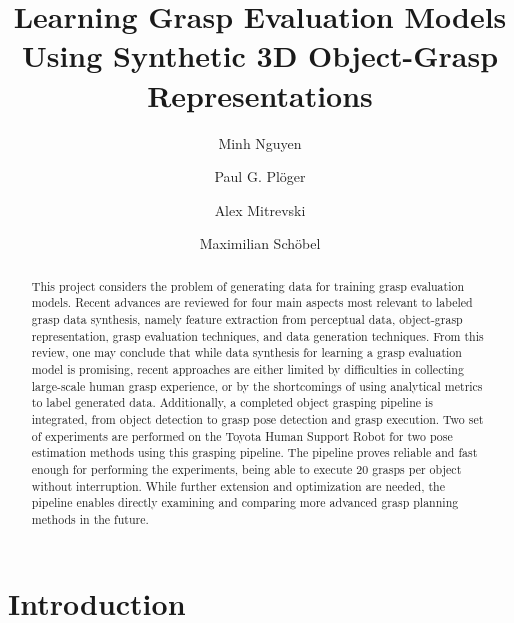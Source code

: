 \documentclass[runningheads]{../llncs}
\begin{document}
\title{Learning Grasp Evaluation Models Using Synthetic 3D Object-Grasp Representations}

%
\author{
    Minh Nguyen  \and
    Paul G. Pl\"{o}ger \and
    Alex Mitrevski \and
    Maximilian Sch\"{o}bel}
%
%
%
\maketitle              %

\begin{abstract}
This project considers the problem of generating data for training grasp evaluation models. Recent advances are reviewed
for four main aspects most relevant to labeled grasp data synthesis, namely feature extraction from perceptual data,
object-grasp representation, grasp evaluation techniques, and data generation techniques. From this review, one may
conclude that while data synthesis for learning a grasp evaluation model is promising, recent approaches are either
limited by difficulties in collecting large-scale human grasp experience, or by the shortcomings of using analytical
metrics to label generated data. Additionally, a completed object grasping pipeline is integrated, from object
detection to grasp pose detection and grasp execution. Two set of experiments are performed on the Toyota Human Support
Robot for two pose estimation methods using this grasping pipeline. The pipeline proves reliable and fast enough for
performing the experiments, being able to execute 20 grasps per object without interruption. While further extension and
optimization are needed, the pipeline enables directly examining and comparing more advanced grasp planning methods in
the future.

\end{abstract}


\section{Introduction}
\end{document}
